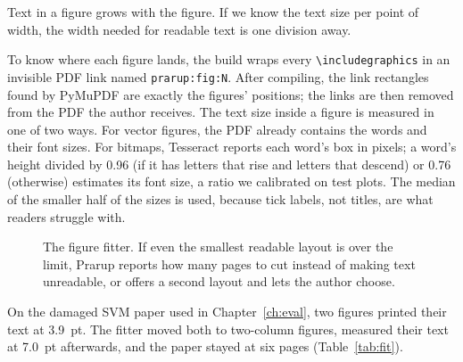 \documentclass[11pt,a4paper,oneside,openany]{book}
\newcommand{\code}[1]{\texttt{#1}}
\begin{document}
\begin{takeaway}
Text in a figure grows with the figure. If we know the text size per point of width, the width needed for
readable text is one division away.
\end{takeaway}

To know where each figure lands, the build wraps every \code{\textbackslash includegraphics} in an invisible
PDF link named \code{prarup:fig:N}. After compiling, the link rectangles found by PyMuPDF are exactly the
figures' positions; the links are then removed from the PDF the author receives. The text size inside a
figure is measured in one of two ways. For vector figures, the PDF already contains the words and their font
sizes. For bitmaps, Tesseract reports each word's box in pixels; a word's height divided by 0.96 (if it has
letters that rise and letters that descend) or 0.76 (otherwise) estimates its font size, a ratio we
calibrated on test plots. The median of the smaller half of the sizes is used, because tick labels, not
titles, are what readers struggle with.

\begin{figure}[htbp]
\centering
{}
\caption{The figure fitter. If even the smallest readable layout is over the limit, Prarup reports how many
pages to cut instead of making text unreadable, or offers a second layout and lets the author choose.}
\end{figure}

On the damaged SVM paper used in Chapter~\ref{ch:eval}, two figures printed their text at 3.9~pt. The fitter
moved both to two-column figures, measured their text at 7.0~pt afterwards, and the paper stayed at six
pages (Table~\ref{tab:fit}).
\end{document}
